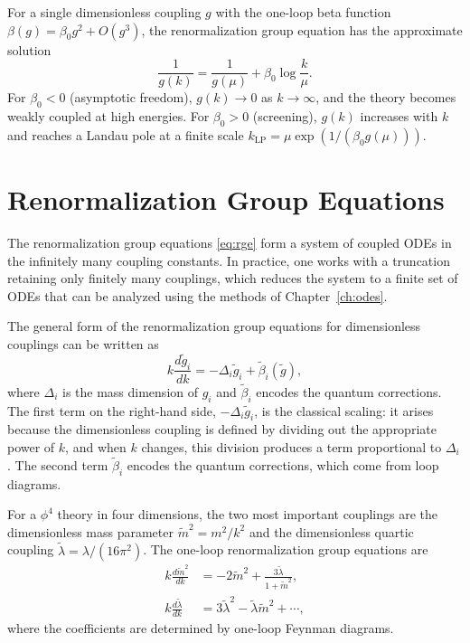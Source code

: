 \documentclass[11pt, twoside, openright]{book}
\theoremstyle{dotted}
\theoremstyle{definition}
\begin{document}
For a single dimensionless coupling $g$ with the one-loop beta function
$\beta(g) = \beta_0 g^2 + O(g^3)$, the renormalization group equation has the
approximate solution
\begin{equation}
  \frac{1}{g(k)} = \frac{1}{g(\mu)} + \beta_0 \log\frac{k}{\mu}.
  \label{eq:rge_one_loop}
\end{equation}
For $\beta_0 < 0$ (asymptotic freedom), $g(k) \to 0$ as $k \to \infty$, and
the theory becomes weakly coupled at high energies. For $\beta_0 > 0$ (screening),
$g(k)$ increases with $k$ and reaches a Landau pole at a finite scale
$k_{\text{LP}} = \mu \exp\!\left(1/(\beta_0 g(\mu))\right)$.

\section{Renormalization Group Equations}

The renormalization group equations \eqref{eq:rge} form a system of coupled ODEs
in the infinitely many coupling constants. In practice, one works with a truncation
retaining only finitely many couplings, which reduces the system to a finite set
of ODEs that can be analyzed using the methods of Chapter~\ref{ch:odes}.

The general form of the renormalization group equations for dimensionless couplings
can be written as
\begin{equation}
  k\frac{d \tilde g_i}{dk} = -\Delta_i \tilde g_i + \tilde\beta_i(\tilde g),
  \label{eq:rge_dimensionless}
\end{equation}
where $\Delta_i$ is the mass dimension of $g_i$ and $\tilde\beta_i$ encodes the
quantum corrections. The first term on the right-hand side, $-\Delta_i \tilde g_i$,
is the classical scaling: it arises because the dimensionless coupling is defined
by dividing out the appropriate power of $k$, and when $k$ changes, this division
produces a term proportional to $\Delta_i$. The second term $\tilde\beta_i$ encodes
the quantum corrections, which come from loop diagrams.

For a $\phi^4$ theory in four dimensions, the two most important couplings are the
dimensionless mass parameter $\tilde m^2 = m^2/k^2$ and the dimensionless quartic
coupling $\tilde\lambda = \lambda/(16\pi^2)$. The one-loop renormalization group
equations are
\begin{align}
  k\frac{d\tilde m^2}{dk} &= -2\tilde m^2 + \frac{3\tilde\lambda}{1+\tilde m^2},
  \label{eq:rge_mass} \\
  k\frac{d\tilde\lambda}{dk} &= 3\tilde\lambda^2 - \tilde\lambda\tilde m^2 + \cdots,
  \label{eq:rge_lambda}
\end{align}
where the coefficients are determined by one-loop Feynman diagrams.
\end{document}
